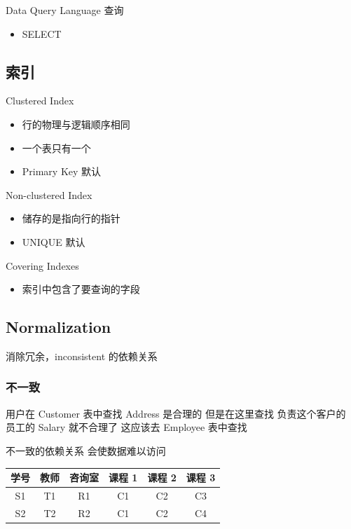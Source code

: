 \documentclass[11pt,journal,compsoc]{IEEEtran}
\begin{document}
Data Query Language 查询

\begin{itemize}
    \item SELECT
\end{itemize}


\subsection{索引}

Clustered Index

\begin{itemize}
    \item 行的物理与逻辑顺序相同
    \item 一个表只有一个
    \item Primary Key 默认
\end{itemize}

Non-clustered Index

\begin{itemize}
    \item 储存的是指向行的指针
    \item UNIQUE 默认
\end{itemize}

Covering Indexes

\begin{itemize}
    \item 索引中包含了要查询的字段
\end{itemize}


\subsection{Normalization}

消除冗余，inconsistent 的依赖关系


\subsubsection{不一致}

用户在 Customer 表中查找 Address 是合理的  
但是在这里查找 负责这个客户的 员工的 Salary 就不合理了  
这应该去 Employee 表中查找

不一致的依赖关系 会使数据难以访问

\begin{table}[H]
    \centering
    \begin{tabular}{|c|c|c|c|c|c|}
        \hline
        学号 & 教师 & 咨询室 & 课程 1 & 课程 2 & 课程 3 \\
        \hline
        S1 & T1 & R1 & C1 & C2 & C3 \\
        \hline
        S2 & T2 & R2 & C1 & C2 & C4 \\
        \hline
    \end{tabular}
\end{table}
\end{document}
